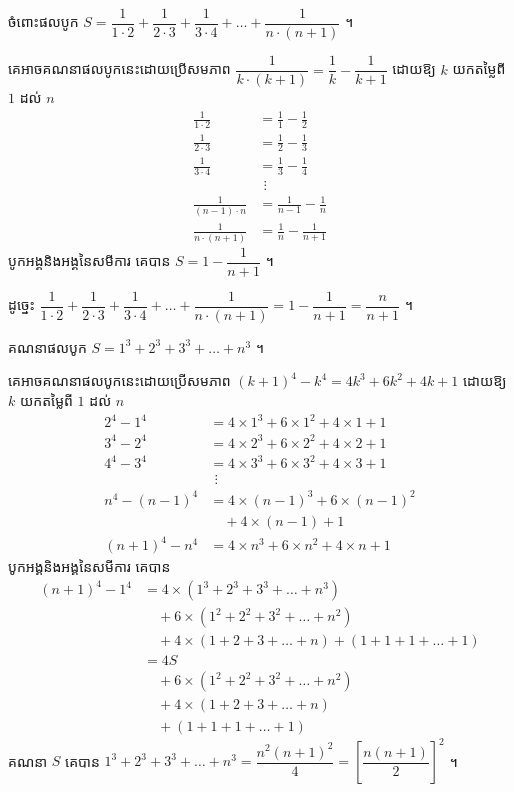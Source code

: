 \begin{example}[ឧទាហរណ៍ ២]
ចំពោះផលបូក $S = \dfrac{1}{1 \cdot 2} + \dfrac{1}{2 \cdot 3} + \dfrac{1}{3 \cdot 4} + \ldots + \dfrac{1}{n \cdot (n+1)}$ ។

គេអាចគណនាផលបូកនេះដោយប្រើសមភាព $\dfrac{1}{k \cdot (k+1)} = \dfrac{1}{k} - \dfrac{1}{k+1}$ ដោយឱ្យ $k$ យកតម្លៃពី $1$ ដល់ $n$
\[
\begin{aligned}
\frac{1}{1 \cdot 2} &= \frac{1}{1} - \frac{1}{2}\\
\frac{1}{2 \cdot 3} &= \frac{1}{2} - \frac{1}{3}\\
\frac{1}{3 \cdot 4} &= \frac{1}{3} - \frac{1}{4}\\
&\ \,\vdots\\
\frac{1}{(n-1) \cdot n} &= \frac{1}{n-1} - \frac{1}{n}\\
\frac{1}{n \cdot (n+1)} &= \frac{1}{n} - \frac{1}{n+1}
\end{aligned}
\]
បូកអង្គនិងអង្គនៃសមីការ គេបាន $S = 1 - \dfrac{1}{n+1}$ ។

ដូច្នេះ $\dfrac{1}{1 \cdot 2} + \dfrac{1}{2 \cdot 3} + \dfrac{1}{3 \cdot 4} + \ldots + \dfrac{1}{n \cdot (n+1)} = 1 - \dfrac{1}{n+1} = \dfrac{n}{n+1}$ ។
\end{example}

\begin{example}[លំហាត់គំរូ]
គណនាផលបូក $S = 1^3 + 2^3 + 3^3 + \ldots + n^3$ ។
\end{example}
\ans
គេអាចគណនាផលបូកនេះដោយប្រើសមភាព $(k+1)^4 - k^4 = 4k^3 + 6k^2 + 4k + 1$ ដោយឱ្យ $k$ យកតម្លៃពី $1$ ដល់ $n$
\[
\begin{aligned}
2^4 - 1^4 &= 4 \times 1^3 + 6 \times 1^2 + 4 \times 1 + 1\\
3^4 - 2^4 &= 4 \times 2^3 + 6 \times 2^2 + 4 \times 2 + 1\\
4^4 - 3^4 &= 4 \times 3^3 + 6 \times 3^2 + 4 \times 3 + 1\\
&\ \,\vdots\\
n^4 - (n-1)^4 &= 4 \times (n-1)^3 + 6 \times (n-1)^2\\
&\quad + 4 \times (n-1) + 1\\
(n+1)^4 - n^4 &= 4 \times n^3 + 6 \times n^2 + 4 \times n + 1
\end{aligned}
\]
បូកអង្គនិងអង្គនៃសមីការ គេបាន
\[
\begin{aligned}
(n+1)^4 - 1^4 &= 4 \times (1^3 + 2^3 + 3^3 + \ldots + n^3)\\
&\quad + 6 \times (1^2 + 2^2 + 3^2 + \ldots + n^2)\\
&\quad + 4 \times (1 + 2 + 3 + \ldots + n) + (1 + 1 + 1 + \ldots + 1)\\
&= 4S\\
&\quad + 6 \times (1^2 + 2^2 + 3^2 + \ldots + n^2)\\
&\quad + 4 \times (1 + 2 + 3 + \ldots + n)\\
&\quad + (1 + 1 + 1 + \ldots + 1)
\end{aligned}
\]
គណនា $S$ គេបាន $1^3 + 2^3 + 3^3 + \ldots + n^3 = \dfrac{n^2(n+1)^2}{4} = \left[\dfrac{n(n+1)}{2}\right]^2$ ។

